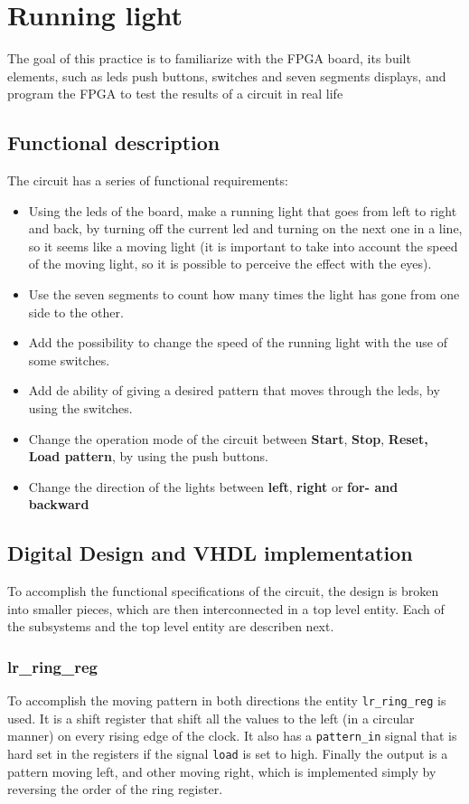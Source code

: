 \documentclass[12pt]{article}   	%
\begin{document}
\section{Running light}
The goal of this practice is to familiarize with the FPGA board, its built elements, such as leds push buttons, switches and seven segments displays, and program the FPGA to test the results of a circuit in real life

\subsection{Functional description}
The circuit has a series of functional requirements:
\begin{itemize}
\item Using the leds of the board, make a running light that goes from left to right and back, by turning off the current led and turning on the next one in a line, so it seems like a moving light (it is important to take into account the speed of the moving light, so it is possible to perceive the effect with the eyes).
\item Use the seven segments to count how many times the light has gone from one side to the other.
\item Add the possibility to change the speed of the running light with the use of some switches.
\item Add de ability of giving a desired pattern that moves through the leds, by using the switches.
\item Change the operation mode of the circuit between \textbf{Start}, \textbf{Stop}, \textbf{Reset, Load pattern}, by using the push buttons.
\item Change the direction of the lights between \textbf{left}, \textbf{right} or \textbf{for- and backward}
\end{itemize}

\subsection{Digital Design and VHDL implementation}
To accomplish the functional specifications of the circuit, the design is broken into smaller pieces, which are then interconnected in a top level entity. Each of the subsystems and the top level entity are describen next.


\subsubsection{lr\_ring\_reg}
To accomplish the moving pattern in both directions the entity \lstinline|lr_ring_reg| is used. It is a shift register that shift all the values to the left (in a circular manner) on every rising edge of the clock. It also has a \lstinline|pattern_in| signal that is hard set in the registers if the signal \lstinline|load| is set to high. Finally the output is a pattern moving left, and other moving right, which is implemented simply by reversing the order of the ring register.
\end{document}

